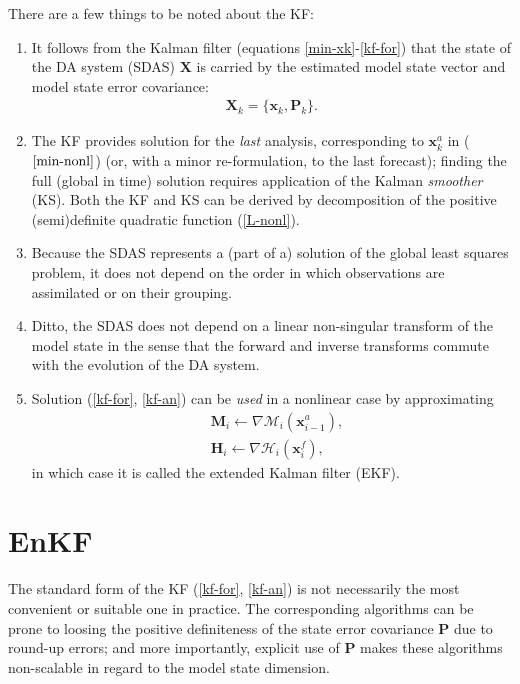\documentclass[11pt]{report}
\newcommand{\mb} {\mathbf}
\begin{document}
There are a few things to be noted about the KF:
\vspace{-3mm}
\begin{enumerate}
\item It follows from the Kalman filter (equations \ref{min-xk}-\ref{kf-for}) that the state of the DA system (SDAS) $\mb X$ is carried by the estimated model state vector and model state error covariance:
\begin{align}
  \label{sdas}
  \mb X_k = \{\mb x_k, \mb P_k\}.
\end{align}
\item The KF provides solution for the \emph{last} analysis, corresponding to $\mb x_k^a$ in ($\ref{min-nonl}$) (or, with a minor re-formulation, to the last forecast); finding the full (global in time) solution requires application of the Kalman \emph{smoother} (KS).
Both the KF and KS can be derived by decomposition of the positive (semi)definite quadratic function (\ref{L-nonl}).
\item Because the SDAS represents a (part of a) solution of the global least squares problem, it does not depend on the order in which observations are assimilated or on their grouping.
\item Ditto, the SDAS does not depend on a linear non-singular transform of the model state in the sense that the forward and inverse transforms commute with the evolution of the DA system.
\item Solution (\ref{kf-for}, \ref{kf-an}) can be \emph{used} in a nonlinear case by approximating
\begin{align*}
  &\mb M_{i} \leftarrow \nabla \mathcal M_i(\mb x_{i-1}^a),\\
  &\mb H_{i} \leftarrow \nabla \mathcal H_i(\mb x_i^f),
\end{align*}
in which case it is called the extended Kalman filter (EKF).
\end{enumerate}

\section{EnKF}

The standard form of the KF (\ref{kf-for}, \ref{kf-an}) is not necessarily the most convenient or suitable one in practice.
The corresponding algorithms can be prone to loosing the positive definiteness of the state error covariance $\mb P$ due to round-up errors; and more importantly, explicit use of $\mb P$ makes these algorithms non-scalable in regard to the model state dimension.
\end{document}
